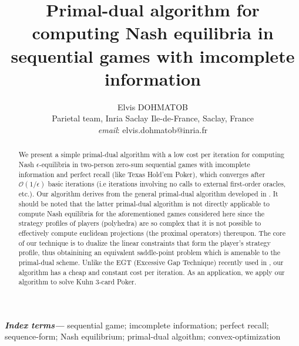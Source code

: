 \documentclass[12pt]{article}
\author{
Elvis DOHMATOB
\\
Parietal team, Inria Saclay Ile-de-France, Saclay, France\\
\textit{email}: elvis.dohmatob@inria.fr}
\title{\bf Primal-dual algorithm for computing Nash equilibria in
sequential games with imcomplete information
}
\providecommand{\keywords}[1]{\textbf{\textit{Index terms---}} #1}
\begin{document}
\maketitle

\begin{abstract}
We present a simple primal-dual algorithm with a low cost per iteration for computing Nash $\epsilon$-equilibria in two-person zero-sum sequential games with imcomplete information and perfect recall (like Texas Hold'em Poker), which converges after $\mathcal{O}(1/\epsilon)$ basic iterations
(i.e iterations involving no
calls to external first-order oracles, etc.). %
Our algorithm derives from the general primal-dual algorithm developed
in \cite{chambolle2010, chambolle2014ergodic}. It should be noted that the latter primal-dual algorithm is not directly applicable to compute Nash equilibria for the aforementioned games considered here since the strategy profiles of players (polyhedra) are so complex that it is not possible
 to effectively compute %
euclidean
 projections (the proximal operators) thereupon.
The core of our technique is to dualize the linear constraints that form the player's strategy profile, thus obtainining an equivalent saddle-point problem which is amenable to the primal-dual scheme. Unlike the EGT (Excessive Gap Technique) recently used in \cite{hoda2010smoothing, gilpinfirst}, our algorithm has a cheap and constant cost per iteration. As an application, we apply our algorithm to solve Kuhn 3-card Poker.
\end{abstract}

\keywords{sequential game; imcomplete information; perfect recall; sequence-form; Nash equilibrium; primal-dual algoithm; convex-optimization}
\end{document}
